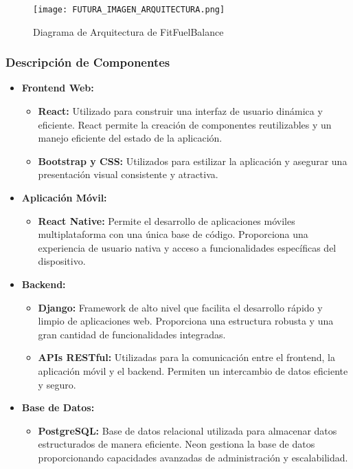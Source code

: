 \begin{figure}[H]
    \centering
    \texttt{[image: FUTURA\_IMAGEN\_ARQUITECTURA.png]}
    \caption{Diagrama de Arquitectura de FitFuelBalance}
    \label{fig:arquitectura}
\end{figure}

\subsubsection{Descripción de Componentes}

\begin{itemize}
    \item \textbf{Frontend Web:} 
    \begin{itemize}
        \item \textbf{React:} Utilizado para construir una interfaz de usuario dinámica y eficiente. React permite la creación de componentes reutilizables y un manejo eficiente del estado de la aplicación.
        \item \textbf{Bootstrap y CSS:} Utilizados para estilizar la aplicación y asegurar una presentación visual consistente y atractiva.
    \end{itemize}
    
    \item \textbf{Aplicación Móvil:} 
    \begin{itemize}
        \item \textbf{React Native:} Permite el desarrollo de aplicaciones móviles multiplataforma con una única base de código. Proporciona una experiencia de usuario nativa y acceso a funcionalidades específicas del dispositivo.
    \end{itemize}
    
    \item \textbf{Backend:} 
    \begin{itemize}
        \item \textbf{Django:} Framework de alto nivel que facilita el desarrollo rápido y limpio de aplicaciones web. Proporciona una estructura robusta y una gran cantidad de funcionalidades integradas.
        \item \textbf{APIs RESTful:} Utilizadas para la comunicación entre el frontend, la aplicación móvil y el backend. Permiten un intercambio de datos eficiente y seguro.
    \end{itemize}
    
    \item \textbf{Base de Datos:} 
    \begin{itemize}
        \item \textbf{PostgreSQL:} Base de datos relacional utilizada para almacenar datos estructurados de manera eficiente. Neon gestiona la base de datos proporcionando capacidades avanzadas de administración y escalabilidad.
    \end{itemize}
    
\end{itemize}

